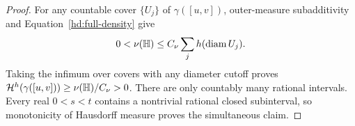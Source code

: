 \begin{proof}
For any countable cover \(\{U_j\}\) of \(\gamma([u,v])\),
outer-measure subadditivity and Equation~\eqref{hd:full-density}
give
\[
 0<\nu(\mathbb H)\le C_\nu\sum_j h(\operatorname{diam} U_j).
\]
Taking the infimum over covers with any diameter cutoff proves
\(\mathcal H^h(\gamma([u,v]))\ge\nu(\mathbb H)/C_\nu>0\).
There are only countably many rational intervals. Every real
\(0<s<t\) contains a nontrivial rational closed subinterval, so
monotonicity of Hausdorff measure proves the simultaneous claim.
\end{proof}


